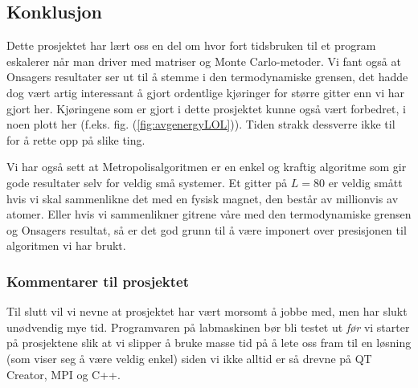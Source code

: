 \documentclass[norsk, 10pt]{article}
\begin{document}
\subsection*{Konklusjon}
Dette prosjektet har lært oss en del om hvor fort tidsbruken til et program eskalerer når man driver med matriser og Monte Carlo-metoder. Vi fant også at Onsagers resultater ser ut til å stemme i den termodynamiske grensen, det hadde dog vært artig interessant å gjort ordentlige kjøringer for større gitter enn vi har gjort her. Kjøringene som er gjort i dette prosjektet kunne også vært forbedret, i noen plott her (f.eks. fig. (\ref{fig:avgenergyLOL})). Tiden strakk dessverre ikke til for å rette opp på slike ting.

Vi har også sett at Metropolisalgoritmen er en enkel og kraftig algoritme som gir gode resultater selv for veldig små systemer. Et gitter på $L=80$ er veldig smått hvis vi skal sammenlikne det med en fysisk magnet, den består av millionvis av atomer. Eller hvis vi sammenlikner gitrene våre med den termodynamiske grensen og Onsagers resultat, så er det god grunn til å være imponert over presisjonen til algoritmen vi har brukt.

\subsubsection*{Kommentarer til prosjektet}
Til slutt vil vi nevne at prosjektet har vært morsomt å jobbe med, men har slukt unødvendig mye tid. Programvaren på labmaskinen bør bli testet ut \emph{før} vi starter på prosjektene slik at vi slipper å bruke masse tid på å lete oss fram til en løsning (som viser seg å være veldig enkel) siden vi ikke alltid er så drevne på QT Creator, MPI og C++.
\end{document}
